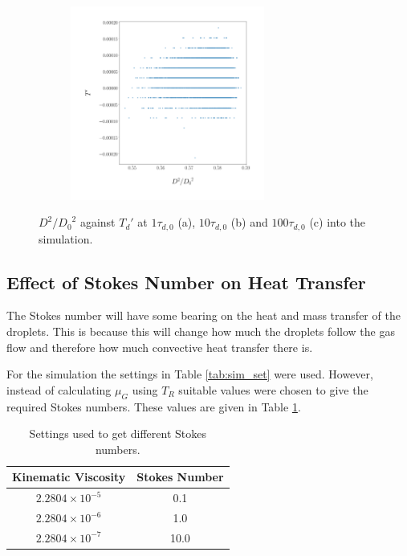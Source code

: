 \documentclass[../Interim_Report_Master]{subfiles}
\begin{document}
\begin{figure}\ContinuedFloat
	\centering
	\begin{subfigure}{\textwidth}
		\centering
		\includegraphics[width=0.7\textwidth]{./Diagrams/Temp_Mass_PDFs_timestep_800.png}
		\caption{}
\end{subfigure}
	\caption{$D^2/{D_0}^2$ against ${T_d}'$ at $1\tau_{d,0}$ (a), $10\tau_{d,0}$ (b) and $100\tau_{d,0}$ (c) into the simulation.}
	\label{fig:heat_mass_pdf}
\end{figure}
\subsection{Effect of Stokes Number on Heat Transfer}
The Stokes number will have some bearing on the heat and mass transfer of the droplets. This is because this will change how much the droplets follow the gas flow and therefore how much convective heat transfer there is.

For the simulation the settings in Table \ref{tab:sim_set} were used. However, instead of calculating $\mu_G$ using $T_R$ suitable values were chosen to give the required Stokes numbers. These values are given in Table \ref{tab:stk_nums}.
\begin{table}[H]
	\centering
	\begin{tabular}{|c c|}
		\hline
		\textbf{Kinematic Viscosity} & \textbf{Stokes Number} \\ \hline
		$2.2804\times 10^{-5}$ & 0.1 \\
		$2.2804\times 10^{-6}$ & 1.0 \\
		$2.2804\times 10^{-7}$ & 10.0 \\ \hline
	\end{tabular}
	\caption{Settings used to get different Stokes numbers.}
	\label{tab:stk_nums}
\end{table}
\end{document}
